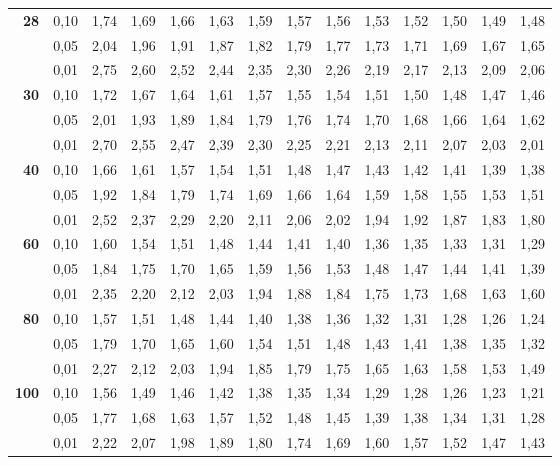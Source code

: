 \documentclass[12pt,a4paper]{article}
\begin{document}
{\begin{longtable}{@{\extracolsep{\fill}}rrrrrrrrrrrrrr@{}}
\addlinespace[1pt]
\textbf{28} & 0,10 & 1,74 & 1,69 & 1,66 & 1,63 & 1,59 & 1,57 & 1,56 & 1,53 & 1,52 & 1,50 & 1,49 & 1,48 \\*
 & 0,05 & 2,04 & 1,96 & 1,91 & 1,87 & 1,82 & 1,79 & 1,77 & 1,73 & 1,71 & 1,69 & 1,67 & 1,65 \\*
 & 0,01 & 2,75 & 2,60 & 2,52 & 2,44 & 2,35 & 2,30 & 2,26 & 2,19 & 2,17 & 2,13 & 2,09 & 2,06 \\
\addlinespace[1pt]
\textbf{30} & 0,10 & 1,72 & 1,67 & 1,64 & 1,61 & 1,57 & 1,55 & 1,54 & 1,51 & 1,50 & 1,48 & 1,47 & 1,46 \\*
 & 0,05 & 2,01 & 1,93 & 1,89 & 1,84 & 1,79 & 1,76 & 1,74 & 1,70 & 1,68 & 1,66 & 1,64 & 1,62 \\*
 & 0,01 & 2,70 & 2,55 & 2,47 & 2,39 & 2,30 & 2,25 & 2,21 & 2,13 & 2,11 & 2,07 & 2,03 & 2,01 \\
\addlinespace[1pt]
\textbf{40} & 0,10 & 1,66 & 1,61 & 1,57 & 1,54 & 1,51 & 1,48 & 1,47 & 1,43 & 1,42 & 1,41 & 1,39 & 1,38 \\*
 & 0,05 & 1,92 & 1,84 & 1,79 & 1,74 & 1,69 & 1,66 & 1,64 & 1,59 & 1,58 & 1,55 & 1,53 & 1,51 \\*
 & 0,01 & 2,52 & 2,37 & 2,29 & 2,20 & 2,11 & 2,06 & 2,02 & 1,94 & 1,92 & 1,87 & 1,83 & 1,80 \\
\addlinespace[1pt]
\textbf{60} & 0,10 & 1,60 & 1,54 & 1,51 & 1,48 & 1,44 & 1,41 & 1,40 & 1,36 & 1,35 & 1,33 & 1,31 & 1,29 \\*
 & 0,05 & 1,84 & 1,75 & 1,70 & 1,65 & 1,59 & 1,56 & 1,53 & 1,48 & 1,47 & 1,44 & 1,41 & 1,39 \\*
 & 0,01 & 2,35 & 2,20 & 2,12 & 2,03 & 1,94 & 1,88 & 1,84 & 1,75 & 1,73 & 1,68 & 1,63 & 1,60 \\
\addlinespace[1pt]
\textbf{80} & 0,10 & 1,57 & 1,51 & 1,48 & 1,44 & 1,40 & 1,38 & 1,36 & 1,32 & 1,31 & 1,28 & 1,26 & 1,24 \\*
 & 0,05 & 1,79 & 1,70 & 1,65 & 1,60 & 1,54 & 1,51 & 1,48 & 1,43 & 1,41 & 1,38 & 1,35 & 1,32 \\*
 & 0,01 & 2,27 & 2,12 & 2,03 & 1,94 & 1,85 & 1,79 & 1,75 & 1,65 & 1,63 & 1,58 & 1,53 & 1,49 \\
\addlinespace[1pt]
\textbf{100} & 0,10 & 1,56 & 1,49 & 1,46 & 1,42 & 1,38 & 1,35 & 1,34 & 1,29 & 1,28 & 1,26 & 1,23 & 1,21 \\*
 & 0,05 & 1,77 & 1,68 & 1,63 & 1,57 & 1,52 & 1,48 & 1,45 & 1,39 & 1,38 & 1,34 & 1,31 & 1,28 \\*
 & 0,01 & 2,22 & 2,07 & 1,98 & 1,89 & 1,80 & 1,74 & 1,69 & 1,60 & 1,57 & 1,52 & 1,47 & 1,43 \\

\end{longtable}}
\end{document}
